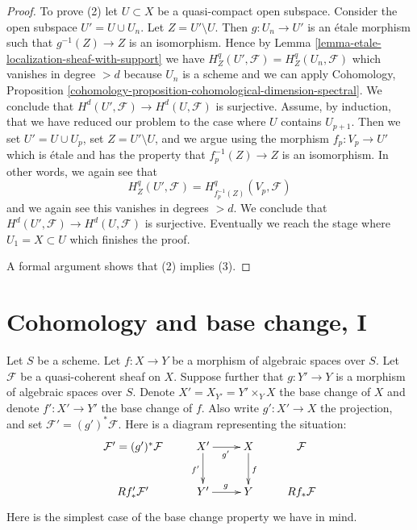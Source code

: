 \documentclass{stacks-project}
\theoremstyle{plain}
\theoremstyle{definition}
\theoremstyle{remark}
\numberwithin{equation}{subsection}
\begin{document}
\begin{proof}
\medskip\noindent
To prove (2) let $U \subset X$ be a quasi-compact open subspace.
Consider the open subspace $U' = U \cup U_n$. Let $Z = U' \setminus U$.
Then $g : U_n \to U'$ is an \'etale morphism such that
$g^{-1}(Z) \to Z$ is an isomorphism. Hence by
Lemma \ref{lemma-etale-localization-sheaf-with-support}
we have $H^q_Z(U', \mathcal{F}) = H^q_Z(U_n, \mathcal{F})$
which vanishes in degree $> d$ because $U_n$ is a scheme
and we can apply
Cohomology, Proposition
\ref{cohomology-proposition-cohomological-dimension-spectral}.
We conclude that $H^d(U', \mathcal{F}) \to H^d(U, \mathcal{F})$
is surjective. Assume, by induction, that we have reduced
our problem to the case where $U$ contains $U_{p + 1}$.
Then we set $U' = U \cup U_p$, set $Z = U' \setminus U$, and
we argue using the morphism $f_p : V_p \to U'$ which is \'etale
and has the property that $f_p^{-1}(Z) \to Z$ is an isomorphism.
In other words, we again see that
$$
H^q_Z(U', \mathcal{F}) = H^q_{f_p^{-1}(Z)}(V_p, \mathcal{F})
$$
and we again see this vanishes in degrees $> d$.
We conclude that $H^d(U', \mathcal{F}) \to H^d(U, \mathcal{F})$
is surjective. Eventually we reach the stage where $U_1 = X \subset U$
which finishes the proof.

\medskip\noindent
A formal argument shows that (2) implies (3).
\end{proof}








\section{Cohomology and base change, I}
\label{section-cohomology-and-base-change}

\noindent
Let $S$ be a scheme.
Let $f : X \to Y$ be a morphism of algebraic spaces over $S$.
Let $\mathcal{F}$ be a quasi-coherent sheaf on $X$.
Suppose further that $g : Y' \to Y$ is a morphism of algebraic spaces over
$S$. Denote $X' = X_{Y'} = Y' \times_Y X$ the base change of $X$ and denote
$f' : X' \to Y'$ the base change of $f$.
Also write $g' : X' \to X$ the projection,
and set $\mathcal{F}' = (g')^*\mathcal{F}$.
Here is a diagram representing the situation:
\begin{equation}
\label{equation-base-change-diagram}
\vcenter{
\xymatrix{
\mathcal{F}' = (g')^*\mathcal{F} &
X' \ar[r]_{g'} \ar[d]_{f'} &
X \ar[d]^f &
\mathcal{F} \\
Rf'_*\mathcal{F}' &
Y' \ar[r]^g &
Y &
Rf_*\mathcal{F}
}
}
\end{equation}
Here is the simplest case of the base change property we have in mind.
\end{document}
